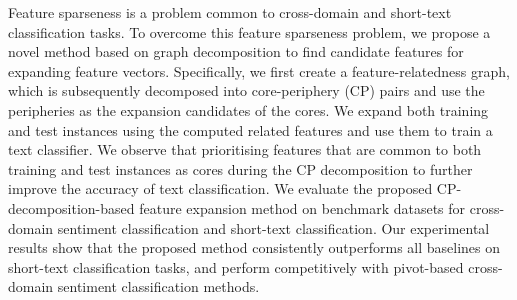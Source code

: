 Feature sparseness is a problem common to cross-domain and short-text classification tasks. To overcome this feature sparseness problem, we propose a novel method based on graph decomposition to find candidate features for expanding feature vectors. Specifically, we first create a feature-relatedness graph, which is subsequently decomposed into core-periphery (CP) pairs and use the peripheries as the expansion candidates of the cores. We expand both training and test instances using the computed related features and use them to train a text classifier. We observe that prioritising features that are common to both training and test instances as cores during the CP decomposition to further improve the accuracy of text classification. We evaluate the proposed CP-decomposition-based feature expansion method on benchmark datasets for cross-domain sentiment classification and short-text classification. Our experimental results show that the proposed method consistently outperforms all baselines on short-text classification tasks, and perform competitively with pivot-based cross-domain sentiment classification methods.
